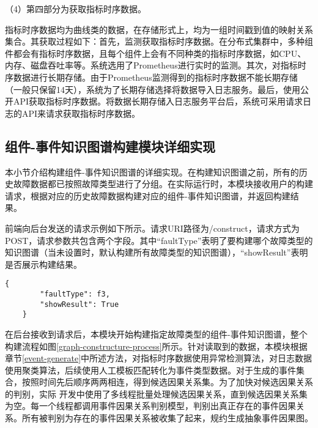     （4）第四部分为获取指标时序数据。

    指标时序数据均为曲线类的数据，在存储形式上，均为一组时间戳到值的映射关系集合。其获取过程如下：首先，监测获取指标时序数据。在分布式集群中，多种组件都会有指标时序数据，且每个组件上会有不同种类的指标时序数据，如CPU、内存、磁盘吞吐率等。系统选用了Prometheus进行实时的监测。其次，对指标时序数据进行长期存储。由于Prometheus监测得到的指标时序数据不能长期存储（一般只保留14天），系统为了长期存储选择将数据导入日志服务。最后，使用公开API获取指标时序数据。将数据长期存储入日志服务平台后，系统可采用请求日志的API来请求获取指标时序数据。

\subsection{组件-事件知识图谱构建模块详细实现}
本小节介绍构建组件-事件知识图谱的详细实现。在构建知识图谱之前，所有的历史故障数据都已按照故障类型进行了分组。在实际运行时，本模块接收用户的构建请求，根据对应的历史故障数据构建对应的组件-事件知识图谱，并返回构建结果。

前端向后台发送的请求示例如下所示。请求URI路径为/construct，请求方式为POST，请求参数共包含两个字段。其中“faultType”表明了要构建哪个故障类型的知识图谱（当未设置时，默认构建所有故障类型的知识图谱），“showResult”表明是否展示构建结果。

\begin{lstlisting}[xleftmargin=12em,label=code]
    {
        "faultType": f3,
        "showResult": True
    }
\end{lstlisting}

在后台接收到请求后，本模块开始构建指定故障类型的组件-事件知识图谱，整个构建流程如图\ref{graph-constructure-process}所示。针对读取到的数据，本模块根据章节\ref{event-generate}中所述方法，对指标时序数据使用异常检测算法，对日志数据使用聚类算法，后续使用人工模板匹配转化为事件类型数据。对于生成的事件集合，按照时间先后顺序两两相连，得到候选因果关系集。为了加快对候选因果关系的判别，实际
开发中使用了多线程批量处理候选因果关系，直到候选因果关系集为空。每一个线程都调用事件因果关系判别模型，判别出真正存在的事件因果关系。所有被判别为存在的事件因果关系被收集了起来，规约生成抽象事件因果图。

